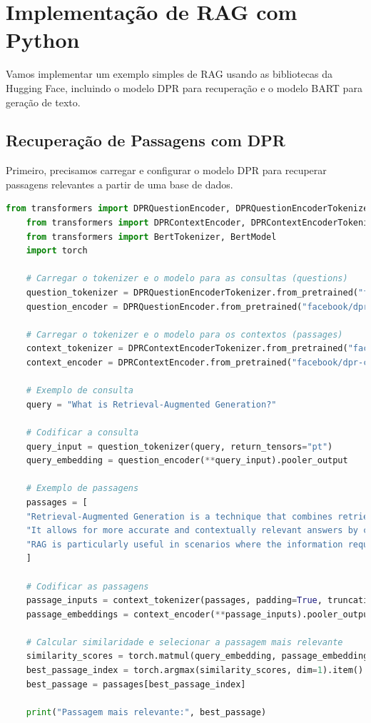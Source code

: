 \documentclass[14pt,a4paper,oneside]{book}
\begin{document}
\section{Implementação de RAG com Python}

Vamos implementar um exemplo simples de RAG usando as bibliotecas da Hugging Face, incluindo o modelo DPR para recuperação e o modelo BART para geração de texto.

\subsection{Recuperação de Passagens com DPR}

Primeiro, precisamos carregar e configurar o modelo DPR para recuperar passagens relevantes a partir de uma base de dados.

\begin{lstlisting}[language=Python]
	from transformers import DPRQuestionEncoder, DPRQuestionEncoderTokenizer
	from transformers import DPRContextEncoder, DPRContextEncoderTokenizer
	from transformers import BertTokenizer, BertModel
	import torch
	
	# Carregar o tokenizer e o modelo para as consultas (questions)
	question_tokenizer = DPRQuestionEncoderTokenizer.from_pretrained("facebook/dpr-question_encoder-single-nq-base")
	question_encoder = DPRQuestionEncoder.from_pretrained("facebook/dpr-question_encoder-single-nq-base")
	
	# Carregar o tokenizer e o modelo para os contextos (passages)
	context_tokenizer = DPRContextEncoderTokenizer.from_pretrained("facebook/dpr-ctx_encoder-single-nq-base")
	context_encoder = DPRContextEncoder.from_pretrained("facebook/dpr-ctx_encoder-single-nq-base")
	
	# Exemplo de consulta
	query = "What is Retrieval-Augmented Generation?"
	
	# Codificar a consulta
	query_input = question_tokenizer(query, return_tensors="pt")
	query_embedding = question_encoder(**query_input).pooler_output
	
	# Exemplo de passagens
	passages = [
	"Retrieval-Augmented Generation is a technique that combines retrieval of relevant information with text generation.",
	"It allows for more accurate and contextually relevant answers by consulting external knowledge bases.",
	"RAG is particularly useful in scenarios where the information required to answer a query is not present in the training data of the language model."
	]
	
	# Codificar as passagens
	passage_inputs = context_tokenizer(passages, padding=True, truncation=True, return_tensors="pt")
	passage_embeddings = context_encoder(**passage_inputs).pooler_output
	
	# Calcular similaridade e selecionar a passagem mais relevante
	similarity_scores = torch.matmul(query_embedding, passage_embeddings.T)
	best_passage_index = torch.argmax(similarity_scores, dim=1).item()
	best_passage = passages[best_passage_index]
	
	print("Passagem mais relevante:", best_passage)
\end{lstlisting}
\end{document}
